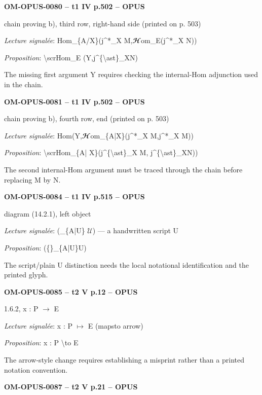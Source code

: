 \par\noindent\textbf{OM-OPUS-0080 -- t1 IV p.502 -- OPUS}\par
chain proving b), third row, right-hand side (printed on p. 503)\par
\emph{Lecture signalée}: Hom\_\{A/X\}(j\textasciicircum{}*\_X M,\ensuremath{𝓗}om\_E(j\textasciicircum{}*\_X N))\par
\emph{Proposition}: \textbackslash{}scrHom\_E (Y,j\textasciicircum{}\{\textbackslash{}ast\}\_XN)\par
The missing first argument Y requires checking the internal-Hom adjunction used in the chain.\par
\par\noindent\textbf{OM-OPUS-0081 -- t1 IV p.502 -- OPUS}\par
chain proving b), fourth row, end (printed on p. 503)\par
\emph{Lecture signalée}: Hom(Y,\ensuremath{𝓗}om\_\{A|X\}(j\textasciicircum{}*\_X M,j\textasciicircum{}*\_X M))\par
\emph{Proposition}: \textbackslash{}scrHom\_\{A| X\}(j\textasciicircum{}\{\textbackslash{}ast\}\_X M, j\textasciicircum{}\{\textbackslash{}ast\}\_XN))\par
The second internal-Hom argument must be traced through the chain before replacing M by N.\par
\par\noindent\textbf{OM-OPUS-0084 -- t1 IV p.515 -- OPUS}\par
diagram (14.2.1), left object\par
\emph{Lecture signalée}: (\_\{A|U\} \ensuremath{𝒰}) — a handwritten script U\par
\emph{Proposition}: (\{\}\_\{A|U\}U)\par
The script/plain U distinction needs the local notational identification and the printed glyph.\par
\par\noindent\textbf{OM-OPUS-0085 -- t2 V p.12 -- OPUS}\par
1.6.2, x : P \ensuremath{\to} E\par
\emph{Lecture signalée}: x : P \ensuremath{\longmapsto} E (mapsto arrow)\par
\emph{Proposition}: x : P \textbackslash{}to E\par
The arrow-style change requires establishing a misprint rather than a printed notation convention.\par
\par\noindent\textbf{OM-OPUS-0087 -- t2 V p.21 -- OPUS}\par

